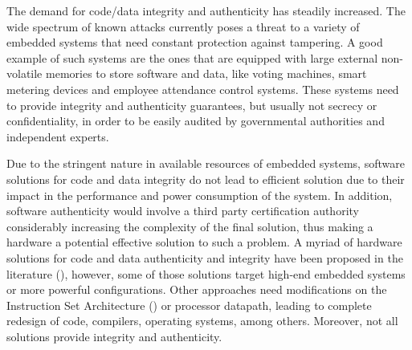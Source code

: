 
The demand for code/data integrity and authenticity has steadily increased. The wide spectrum of known attacks currently poses a threat to a variety of embedded systems that need constant protection against tampering. A good example of such systems are the ones that are equipped with large external non-volatile memories to store software and data, like voting machines, smart metering devices and employee attendance control systems. These systems need to provide integrity and authenticity guarantees, but usually not secrecy or confidentiality, in order to be easily audited by governmental authorities and independent experts.

Due to the stringent nature in available resources of embedded systems, software solutions for code and data integrity do not lead to efficient solution due to their impact in the performance and power consumption of the system. In addition, software authenticity would involve a third party certification authority considerably increasing the complexity of the final solution, thus making a hardware a potential effective solution to such a problem. A myriad of hardware solutions for code and data authenticity and integrity have been proposed in the literature (\cite{Suh2005:AEGISImplementation,Vaslin2009:OTP,Hong2010:FEDTIC,Bobade2015:SecurityFPGA}), however, some of those solutions target high-end embedded systems or more powerful configurations.
Other approaches need modifications on the Instruction Set Architecture (\isa) or processor datapath, leading to complete redesign of code, compilers, operating systems, among others. Moreover, not all solutions provide integrity and authenticity.

